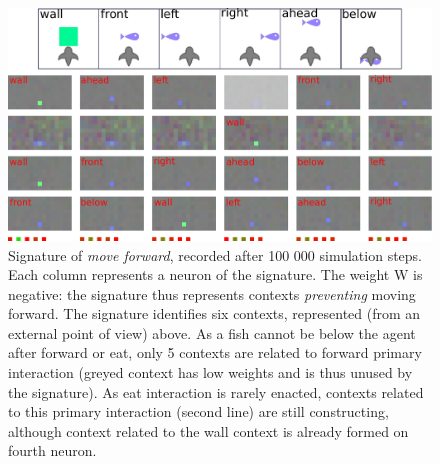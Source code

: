 \documentclass[conference]{IEEEtran}
\begin{document}

\begin{figure}[htbp]
\centerline{\includegraphics[scale=0.35]{img/sig_forward.pdf}}
\caption{Signature of \textit{move forward}, recorded after 100 000 simulation steps. Each column represents a neuron of the signature. The weight W is negative: the signature thus represents contexts \textit{preventing} moving forward. The signature identifies six contexts, represented (from an external point of view) above. As a fish cannot be below the agent after forward or eat, only 5 contexts are related to forward primary interaction (greyed context has low weights and is thus unused by the signature). As eat interaction is rarely enacted, contexts related to this primary interaction (second line) are still constructing, although context related to the wall context is already formed on fourth neuron.}
\label{fig}
\end{figure}
\end{document}
